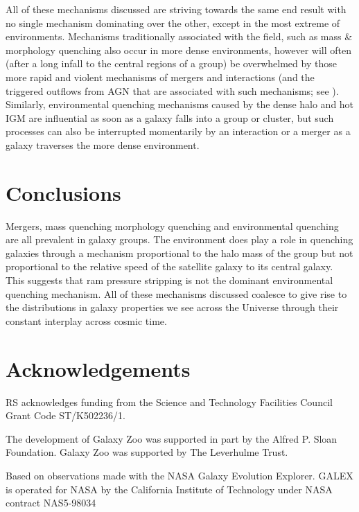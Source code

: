 \documentclass[useAMS,usenatbib]{mn2e}
\begin{document}
All of these mechanisms discussed are striving towards the same end result with no single mechanism dominating over the other, except in the most extreme of environments. Mechanisms traditionally associated with the field, such as mass \& morphology quenching also occur in more dense environments, however will often (after a long infall to the central regions of a group) be overwhelmed by those more rapid and violent mechanisms of mergers and interactions (and the triggered outflows from AGN that are associated with such mechanisms; see \citealt{smethurst16}). Similarly, environmental quenching mechanisms caused by the dense halo and hot IGM are influential as soon as a galaxy falls into a group or cluster, but such processes can also be interrupted momentarily by an interaction or a merger as a galaxy traverses the more dense environment.   


\section{Conclusions}\label{sec:conc}

Mergers, mass quenching morphology quenching and environmental quenching are all prevalent in galaxy groups. The environment does play a role in quenching galaxies through a mechanism proportional to the halo mass of the group but not proportional to the relative speed of the satellite galaxy to its central galaxy. This suggests that ram pressure stripping is not the dominant environmental quenching mechanism. All of these mechanisms discussed coalesce to give rise to the distributions in galaxy properties we see across the Universe through their constant interplay across cosmic time. 

\section*{Acknowledgements}

RS acknowledges funding from the Science and Technology Facilities Council Grant Code ST/K502236/1. 

The development of Galaxy Zoo was supported in part by the Alfred P. Sloan Foundation. Galaxy Zoo was supported by The Leverhulme Trust. 

Based on observations made with the NASA Galaxy Evolution Explorer.  GALEX is operated for NASA by the California Institute of Technology under NASA contract NAS5-98034
\end{document}
